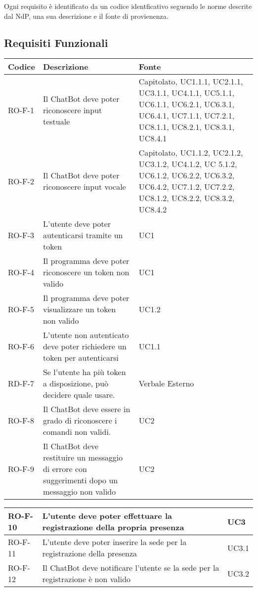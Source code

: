 Ogni requisito è identificato da un codice identficativo seguendo le norme descrite dal NdP, una sua descrizione e il fonte di provienenza.
\subsection{Requisiti Funzionali}
\begin{center}
\renewcommand{\arraystretch}{1.8} %
\begin{tabular}{ | m{8em} | m{18em} | m{12em} | }
\hline
Codice&Descrizione&Fonte\\
\hline
RO-F-1 & Il ChatBot deve poter riconoscere input testuale & Capitolato, UC1.1.1, UC2.1.1, UC3.1.1, UC4.1.1, UC5.1.1, UC6.1.1, UC6.2.1, UC6.3.1, UC6.4.1, UC7.1.1, UC7.2.1, UC8.1.1, UC8.2.1,  UC8.3.1, UC8.4.1\\
\hline
RO-F-2&Il ChatBot deve poter riconoscere input vocale&Capitolato, UC1.1.2, UC2.1.2, UC3.1.2, UC4.1.2, UC 5.1.2, UC6.1.2, UC6.2.2, UC6.3.2, UC6.4.2, UC7.1.2, UC7.2.2, UC8.1.2, UC8.2.2,  UC8.3.2, UC8.4.2\\
\hline
RO-F-3&L’utente deve poter autenticarsi tramite un token&UC1\\
\hline
RO-F-4&Il programma deve poter riconoscere un token non valido&UC1\\
\hline
RO-F-5&Il programma deve poter visualizzare un token non valido&UC1.2\\
\hline
RO-F-6&L’utente non autenticato deve poter richiedere un token per autenticarsi&UC1.1\\
\hline
RD-F-7&Se l’utente ha più token a disposizione, può decidere quale usare.&Verbale Esterno\\
\hline
RO-F-8&Il ChatBot deve essere in grado di riconoscere i comandi non validi.&UC2\\
\hline
RO-F-9&Il ChatBot deve restituire un messaggio di errore con suggerimenti dopo un messaggio non valido &UC2 \\
\hline
\end{tabular}
\newpage
\begin{tabular}{ | m{8em} | m{18em} | m{12em} | }
\hline
RO-F-10&L’utente deve poter effettuare la registrazione della propria presenza &UC3 \\
\hline
RO-F-11&L’utente deve poter inserire la sede per la registrazione della presenza &UC3.1 \\
\hline
RO-F-12&Il ChatBot deve notificare l’utente se la sede per la registrazione è non valido &UC3.2 \\

\end{tabular}
\end{center}
